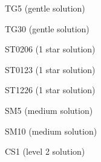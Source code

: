 \documentclass[10pt,letterpaper]{article}
\author{Germ\'{a}n Avendaño Ram\'{i}rez}
\begin{document}
\cluefont{\normalsize}

\noindent\begin{minipage}{0.47\linewidth}\begin{center}
TG5 (gentle solution) \\
\end{center}\end{minipage}\hfill
\begin{minipage}{0.47\linewidth}\begin{center}
TG30 (gentle solution) \\
\end{center}\end{minipage}
\vspace*{12pt}

\begin{minipage}{0.47\linewidth}\begin{center}
ST0206 (1 star solution) \\
\end{center}\end{minipage}\hfill
\noindent\begin{minipage}{0.47\linewidth}\begin{center}
ST0123 (1 star solution) \\
\end{center}\end{minipage}
\vspace*{12pt}

\begin{minipage}{0.47\linewidth}\begin{center}
ST1226 (1 star solution) \\
\end{center}\end{minipage}\hfill
\noindent\begin{minipage}{0.47\linewidth}\begin{center}
SM5 (medium solution) \\
\end{center}\end{minipage}

\begin{minipage}{0.47\linewidth}\begin{center}
SM10 (medium solution) \\
\end{center}\end{minipage}\hfill
\begin{minipage}{0.47\linewidth}\begin{center}
CS1 (level 2 solution) \\
\end{center}\end{minipage}
\end{document}
